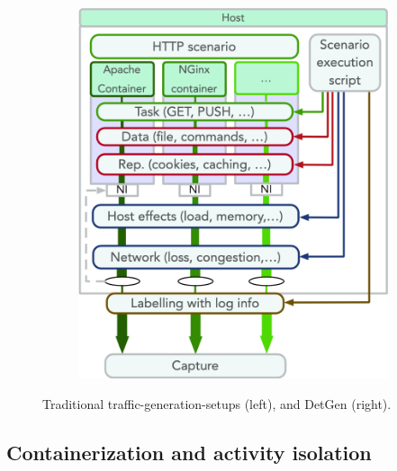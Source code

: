 \documentclass[runningheads]{llncs}
\begin{document}
\begin{figure}
\begin{subfigure}[b]{0.48\textwidth}
\includegraphics[width=\textwidth]{images/Docker_setup_final.png}
\vspace{0.0cm}
\vspace{-0.4cm}
\end{subfigure}
\caption{Traditional traffic-generation-setups (left), and DetGen (right).}\label{Fig:Setup_comp}
\end{figure}

\subsection{Containerization and activity isolation}
\end{document}
